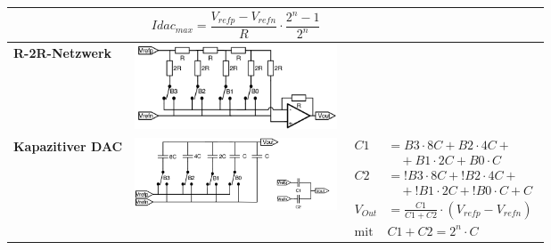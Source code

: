 \begin{tabular}{|>{\bfseries}p{4cm}|c|p{7.5cm}|}
	& \begin{equation*}
		Idac_{max}=\frac{V_{refp}-V_{refn}}{R} \cdot \frac{2^n-1}{2^n}
	  \end{equation*}
	\\ \hline
	R-2R-Netzwerk \hartl{462}
	& \includegraphics[width=6cm, valign=t]{./pictures/r2rnetzwerk.png}
	&
	\\ \hline
	Kapazitiver DAC
	& \includegraphics[width=6cm, valign=t]{./pictures/kapazitiverDAC.png}
	& {\begin{align*}
		C1	&=B3 \cdot 8C+B2 \cdot 4C+ \\
			& \quad +B1\cdot 2C+B0\cdot C \\
		C2	&= !B3 \cdot 8C+!B2 \cdot 4C+ \\
			& \quad +!B1\cdot 2C+!B0\cdot C+C \\
		V_{Out}& =\frac{C1}{C1+C2}\cdot (V_{refp}-V_{refn})\\
		\text{mit } & C1+C2=2^n\cdot C
	  \end{align*}}
	\\ \hline
\end{tabular}


